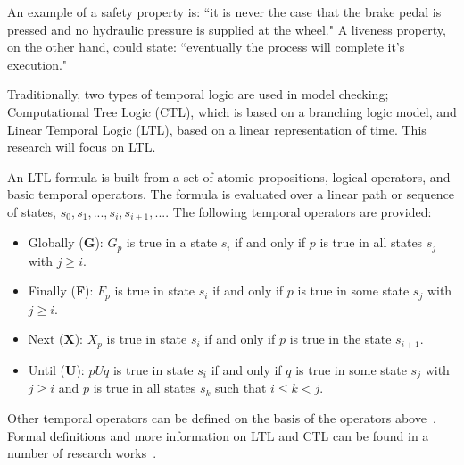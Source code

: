 An example of a safety property is: ``it is never the case that the brake pedal is pressed and no hydraulic pressure is supplied at the wheel." A liveness property, on the other hand, could state: ``eventually the process will complete it's execution." 

Traditionally, two types of temporal logic are used in model checking; Computational Tree Logic (CTL), which is based on a branching logic model, and Linear Temporal Logic (LTL), based on a linear representation of time. This research will focus on LTL. 

An LTL formula is built from a set of atomic propositions, logical operators, and basic temporal operators. The formula is evaluated over a linear path or sequence of states, $s_0, s_1, ..., s_i ,s_{i+1},...$. The following temporal operators are provided:
\begin{itemize}
    \item Globally (\textbf{G}): $G_p$ is true in a state $s_i$ if and only if $p$ is true in all states $s_j$ with $j \geq i$.
    
    \item Finally (\textbf{F}): $F_p$ is true in state $s_i$ if and only if $p$ is true in some state $s_j$ with $j \geq i$.
    
    \item Next (\textbf{X}): $X_p$ is true in state $s_i$ if and only if $p$ is true in the state $s_{i+1}$. 
    
    \item Until (\textbf{U}): $pUq$ is true in state $s_i$ if and only if $q$ is true in some state $s_j$ with $j \geq i$ and $p$ is true in all states $s_k$ such that $i \leq k < j$.
\end{itemize}

Other temporal operators can be defined on the basis of the operators above~\cite{sistla1985complexity}. Formal definitions and more information on LTL and CTL can be found in a number of research works~\cite{Bozzano:2010:DSA:1951720, clarke2018model}.

